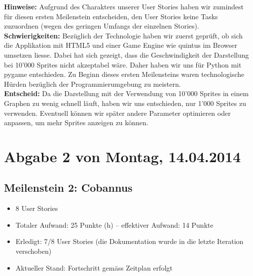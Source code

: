 \begin{small}

\noindent \textbf{Hinweise:} Aufgrund des Charakters unserer User Stories haben wir zumindest für diesen ersten Meilenstein entscheiden, den User Stories keine Tasks zuzuordnen (wegen des geringen Umfangs der einzelnen Stories). \\[-0.25cm]

\noindent \textbf{Schwierigkeiten:} Bezüglich der Technologie haben wir zuerst geprüft, ob sich die Applikation mit HTML5 und einer Game Engine wie quintus im Browser umsetzen liesse. Dabei hat sich gezeigt, dass die Geschwindigkeit der Darstellung bei 10'000 Sprites nicht akzeptabel wäre. Daher haben wir uns für Python mit pygame entschieden. Zu Beginn dieses ersten Meilensteins waren technologische Hürden bezüglich der Programmierumgebung zu meistern. \\ [-0.25cm]

\noindent \textbf{Entscheid:} Da die Darstellung mit der Verwendung von 10'000 Sprites in einem Graphen zu wenig schnell läuft, haben wir uns entschieden, nur 1'000 Sprites zu verwenden. Eventuell können wir später andere Parameter optimieren oder anpassen, um mehr Sprites anzeigen zu können.

\end{small}





\newpage


\vspace*{1cm}


\section*{Abgabe 2 von Montag, 14.04.2014}


\subsection*{Meilenstein 2: Cobannus}

\begin{itemize}[noitemsep]
\item 8 User Stories
\item Totaler Aufwand: 25 Punkte (h) – effektiver Aufwand: 14 Punkte
\item Erledigt: 7/8 User Stories (die Dokumentation wurde in die letzte Iteration verschoben)
\item Aktueller Stand: Fortschritt gemäss Zeitplan erfolgt
\end{itemize}



